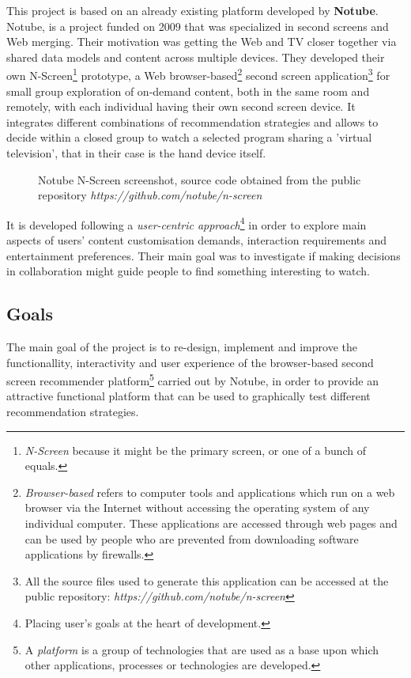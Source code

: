 \documentclass{acm_proc_article-sp}
\begin{document}
This project is based on an already existing platform developed by \textbf{Notube}\cite{aroyo2009notube}. Notube, is a project funded on 2009 that was specialized in second screens and Web merging. Their motivation was getting the Web and TV closer together via shared data models and content across multiple devices. They developed their own N-Screen\footnote{\textit{N-Screen} because it might be the primary screen, or one of a bunch of equals.} prototype, a Web browser-based\footnote{\textit{Browser-based} refers to computer tools and applications which run on a web browser via the Internet without accessing the operating system of any individual computer. These applications are accessed through web pages and can be used by people who are prevented from downloading software applications by firewalls.} second screen application\footnote{All the source files used to generate this application can be accessed at the public repository:
\textit{https://github.com/notube/n-screen}} for small group exploration of on-demand content, both in the same room and remotely, with each individual having their own second screen device. It integrates different combinations of recommendation strategies and allows to decide within a closed group to watch a selected program sharing a 'virtual television', that in their case is the hand device itself. 

\begin{figure}[!htb]
	\centering
	\caption{Notube N-Screen screenshot, source code obtained from the public repository \textit{https://github.com/notube/n-screen}}
	\label{fig:oldnotubenscreen}
\end{figure}

It is developed following a \textit{user-centric approach}\footnote{Placing user's goals at the heart of development.} in order to explore main aspects of users' content customisation demands, interaction requirements and entertainment preferences. Their main goal was to investigate if making decisions in collaboration might guide people to find something interesting to watch. 

\subsection{Goals}

The main goal of the project is to re-design, implement and improve the functionallity, interactivity and user experience of the browser-based second screen recommender platform\footnote{A \textit{platform} is a group of technologies that are used as a base upon which other applications, processes or technologies are developed.} carried out by Notube, in order to provide an attractive functional platform that can be used to graphically test different recommendation strategies. 
\end{document}
